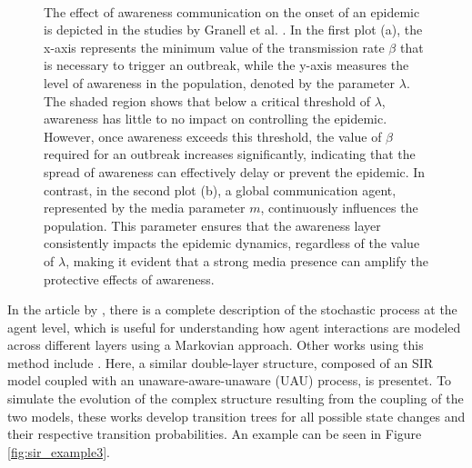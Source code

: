 \begin{figure}[ht]
	\centering
	 \quad
	 \\
	\caption[Metacritical effect]{The effect of awareness communication on the onset of an epidemic is depicted in the studies by Granell et al. \cite{Granell2013, Granell_2014}. In the first plot (a), the x-axis represents the minimum value of the transmission rate $\beta$ that is necessary to trigger an outbreak, while the y-axis measures the level of awareness in the population, denoted by the parameter $\lambda$. The shaded region shows that below a critical threshold of $\lambda$, awareness has little to no impact on controlling the epidemic. However, once awareness exceeds this threshold, the value of $\beta$ required for an outbreak increases significantly, indicating that the spread of awareness can effectively delay or prevent the epidemic. In contrast, in the second plot (b), a global communication agent, represented by the media parameter $m$, continuously influences the population. This parameter ensures that the awareness layer consistently impacts the epidemic dynamics, regardless of the value of $\lambda$, making it evident that a strong media presence can amplify the protective effects of awareness.}
	\label{fig:sir_example2}
\end{figure}


In the article by \cite{Sahneh2013}, there is a complete description of the stochastic process at the agent level, which is useful for understanding how agent interactions are modeled across different layers using a Markovian approach. Other works using this method include \cite{Silva2019, Peng2021, Zuo_2021}. Here, a similar double-layer structure, composed of an SIR model coupled with an unaware-aware-unaware (UAU) process, is presentet. To simulate the evolution of the complex structure resulting from the coupling of the two models, these works develop transition trees for all possible state changes and their respective transition probabilities. An example can be seen in Figure \ref{fig:sir_example3}.  

